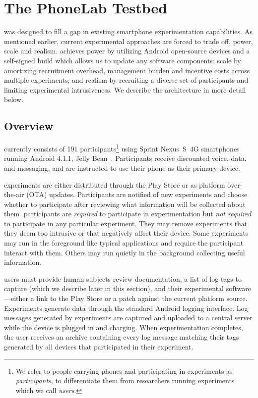 \section{The PhoneLab Testbed}
\label{sec-testbed}

\PhoneLab{} was designed to fill a gap in existing smartphone experimentation
capabilities. As mentioned earlier, current experimental approaches are
forced to trade off, power, scale and realism. \PhoneLab{} achieves power by
utilizing Android open-source devices and a self-signed build which allows us
to update any software components; scale by amortizing recruitment overhead,
management burden and incentive costs across multiple experiments; and
realism by recruiting a diverse set of participants and limiting experimental
intrusiveness. We describe the architecture \PhoneLab{} in more detail below.

\subsection{Overview}

\PhoneLab{} currently consists of 191 participants\footnote{We refer to
people carrying \PhoneLab{} phones and participating in experiments as
\PhoneLab{} \textit{participants}, to differentiate them from researchers
running \PhoneLab{} experiments which we call \textit{users}.} using Sprint
Nexus~S~4G smartphones~\cite{nexuss4g} running Android 4.1.1, Jelly
Bean~\cite{jellybean}. Participants receive discounted voice, data, and
messaging, and are instructed to use their \PhoneLab{} phone as their primary
device.

\PhoneLab{} experiments are either distributed through the Play Store or as
platform over-the-air (OTA) updates. Participants are notified of new
experiments and choose whether to participate after reviewing what
information will be collected about them. \PhoneLab{} participants are
\textit{required} to participate in experimentation but \textit{not required}
to participate in any particular experiment. They may remove experiments
that they deem too intrusive or that negatively affect their device. Some
experiments may run in the foreground like typical applications and require
the participant interact with them. Others may run quietly in the background
collecting useful information. 

\PhoneLab{} users must provide human subjects review documentation, a list of
log tags to capture (which we describe later in this section), and their
experimental software---either a link to the Play Store or a patch against the
current \PhoneLab{} platform source.  Experiments generate data through the
standard Android logging interface. Log messages generated by \PhoneLab{}
experiments are captured and uploaded to a central server while the device is
plugged in and charging. When experimentation completes, the user receives an
archive containing every log message matching their tags generated by all
\PhoneLab{} devices that participated in their experiment.

